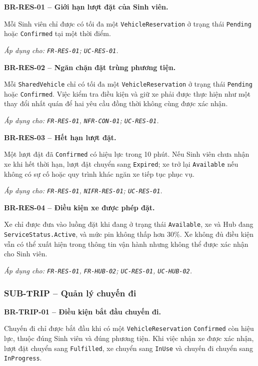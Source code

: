 \noindent\textbf{BR-RES-01 -- Giới hạn lượt đặt của Sinh viên.}\par
\nopagebreak[4]
Mỗi Sinh viên chỉ được có tối đa một \texttt{VehicleReservation} ở trạng thái \texttt{Pending} hoặc \texttt{Confirmed} tại một thời điểm.

\textit{Áp dụng cho: \texttt{FR-RES-01}; \texttt{UC-RES-01}.}

\medskip
\noindent\textbf{BR-RES-02 -- Ngăn chặn đặt trùng phương tiện.}\par
\nopagebreak[4]
Mỗi \texttt{SharedVehicle} chỉ có tối đa một \texttt{VehicleReservation} ở trạng thái \texttt{Pending} hoặc \texttt{Confirmed}. Việc kiểm tra điều kiện và giữ xe phải được thực hiện như một thay đổi nhất quán để hai yêu cầu đồng thời không cùng được xác nhận.

\textit{Áp dụng cho: \texttt{FR-RES-01}, \texttt{NFR-CON-01}; \texttt{UC-RES-01}.}

\medskip
\noindent\textbf{BR-RES-03 -- Hết hạn lượt đặt.}\par
\nopagebreak[4]
Một lượt đặt đã \texttt{Confirmed} có hiệu lực trong 10 phút. Nếu Sinh viên chưa nhận xe khi hết thời hạn, lượt đặt chuyển sang \texttt{Expired}; xe trở lại \texttt{Available} nếu không có sự cố hoặc quy trình khác ngăn xe tiếp tục phục vụ.

\textit{Áp dụng cho: \texttt{FR-RES-01}, \texttt{NIFR-RES-01}; \texttt{UC-RES-01}.}

\medskip
\noindent\textbf{BR-RES-04 -- Điều kiện xe được phép đặt.}\par
\nopagebreak[4]
Xe chỉ được đưa vào luồng đặt khi đang ở trạng thái \texttt{Available}, xe và Hub đang \texttt{ServiceStatus.Active}, và mức pin không thấp hơn 30\%. Xe không đủ điều kiện vẫn có thể xuất hiện trong thông tin vận hành nhưng không thể được xác nhận cho Sinh viên.

\textit{Áp dụng cho: \texttt{FR-RES-01}, \texttt{FR-HUB-02}; \texttt{UC-RES-01}, \texttt{UC-HUB-02}.}

\subsubsection{SUB-TRIP -- Quản lý chuyến đi}

\noindent\textbf{BR-TRIP-01 -- Điều kiện bắt đầu chuyến đi.}\par
\nopagebreak[4]
Chuyến đi chỉ được bắt đầu khi có một \texttt{VehicleReservation} \texttt{Confirmed} còn hiệu lực, thuộc đúng Sinh viên và đúng phương tiện. Khi việc nhận xe được xác nhận, lượt đặt chuyển sang \texttt{Fulfilled}, xe chuyển sang \texttt{InUse} và chuyến đi chuyển sang \texttt{InProgress}.

